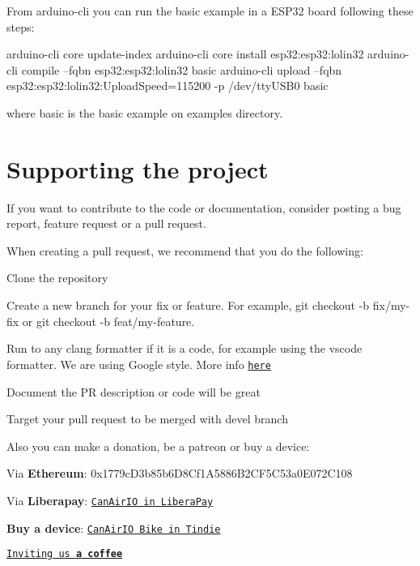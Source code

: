 From {\ttfamily arduino-\/cli} you can run the basic example in a E\+S\+P32 board following these steps\+:


\begin{DoxyCode}
arduino-cli core update-index
arduino-cli core install esp32:esp32:lolin32
arduino-cli compile --fqbn esp32:esp32:lolin32 basic
arduino-cli upload --fqbn esp32:esp32:lolin32:UploadSpeed=115200 -p /dev/ttyUSB0 basic
\end{DoxyCode}


where {\ttfamily basic} is the basic example on examples directory.

\section*{Supporting the project}

If you want to contribute to the code or documentation, consider posting a bug report, feature request or a pull request.

When creating a pull request, we recommend that you do the following\+:


\begin{DoxyItemize}
\item Clone the repository
\item Create a new branch for your fix or feature. For example, git checkout -\/b fix/my-\/fix or git checkout -\/b feat/my-\/feature.
\item Run to any clang formatter if it is a code, for example using the {\ttfamily vscode} formatter. We are using Google style. More info \href{https://clang.llvm.org/docs/ClangFormatStyleOptions.html}{\tt here}
\item Document the PR description or code will be great
\item Target your pull request to be merged with {\ttfamily devel} branch
\end{DoxyItemize}

Also you can make a donation, be a patreon or buy a device\+:

\href{https://raw.githubusercontent.com/kike-canaries/canairio_firmware/master/images/ethereum_donation_address.png}{\tt }


\begin{DoxyItemize}
\item Via {\bfseries Ethereum}\+: {\ttfamily 0x1779c\+D3b85b6\+D8\+Cf1\+A5886\+B2\+C\+F5\+C53a0\+E072\+C108}
\item Via {\bfseries Liberapay}\+: \href{https://liberapay.com/CanAirIO}{\tt Can\+Air\+IO in Libera\+Pay}
\item {\bfseries Buy a device}\+: \href{https://www.tindie.com/products/hpsaturn/canairio-bike/}{\tt Can\+Air\+IO Bike in Tindie}
\item \href{https://www.buymeacoffee.com/hpsaturn}{\tt Inviting us {\bfseries a coffee}}
\end{DoxyItemize}

